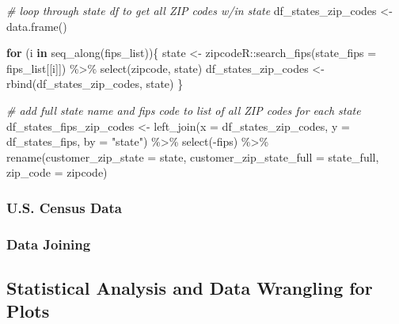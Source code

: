 \documentclass[
]{book}
\newenvironment{Shaded}{\begin{snugshade}}{\end{snugshade}}
\newcommand{\AttributeTok}[1]{\textcolor[rgb]{0.77,0.63,0.00}{#1}}
\newcommand{\CommentTok}[1]{\textcolor[rgb]{0.56,0.35,0.01}{\textit{#1}}}
\newcommand{\ControlFlowTok}[1]{\textcolor[rgb]{0.13,0.29,0.53}{\textbf{#1}}}
\newcommand{\FunctionTok}[1]{\textcolor[rgb]{0.00,0.00,0.00}{#1}}
\newcommand{\NormalTok}[1]{#1}
\newcommand{\OtherTok}[1]{\textcolor[rgb]{0.56,0.35,0.01}{#1}}
\newcommand{\SpecialCharTok}[1]{\textcolor[rgb]{0.00,0.00,0.00}{#1}}
\newcommand{\StringTok}[1]{\textcolor[rgb]{0.31,0.60,0.02}{#1}}
\begin{document}
\begin{Shaded}
\begin{Highlighting}[]
\CommentTok{\# loop through state df to get all ZIP codes w/in state}
\NormalTok{df\_states\_zip\_codes }\OtherTok{\textless{}{-}} \FunctionTok{data.frame}\NormalTok{()}

\ControlFlowTok{for}\NormalTok{ (i }\ControlFlowTok{in} \FunctionTok{seq\_along}\NormalTok{(fips\_list))\{}
\NormalTok{  state }\OtherTok{\textless{}{-}}\NormalTok{ zipcodeR}\SpecialCharTok{::}\FunctionTok{search\_fips}\NormalTok{(}\AttributeTok{state\_fips =}\NormalTok{ fips\_list[[i]]) }\SpecialCharTok{\%\textgreater{}\%} 
    \FunctionTok{select}\NormalTok{(zipcode, state)}
\NormalTok{  df\_states\_zip\_codes }\OtherTok{\textless{}{-}} \FunctionTok{rbind}\NormalTok{(df\_states\_zip\_codes, state)}
\NormalTok{\}}

\CommentTok{\# add full state name and fips code to list of all ZIP codes for each state}
\NormalTok{df\_states\_fips\_zip\_codes }\OtherTok{\textless{}{-}} 
  \FunctionTok{left\_join}\NormalTok{(}\AttributeTok{x =}\NormalTok{ df\_states\_zip\_codes,}
            \AttributeTok{y =}\NormalTok{ df\_states\_fips,}
            \AttributeTok{by =} \StringTok{"state"}\NormalTok{) }\SpecialCharTok{\%\textgreater{}\%} 
  \FunctionTok{select}\NormalTok{(}\SpecialCharTok{{-}}\NormalTok{fips) }\SpecialCharTok{\%\textgreater{}\%} 
  \FunctionTok{rename}\NormalTok{(}\AttributeTok{customer\_zip\_state =}\NormalTok{ state,}
         \AttributeTok{customer\_zip\_state\_full =}\NormalTok{ state\_full,}
         \AttributeTok{zip\_code =}\NormalTok{ zipcode)}
\end{Highlighting}
\end{Shaded}

\hypertarget{u.s.-census-data}{%
\subsubsection{U.S. Census Data}\label{u.s.-census-data}}

\hypertarget{data-joining}{%
\subsubsection{Data Joining}\label{data-joining}}

\hypertarget{statistical-analysis-and-data-wrangling-for-plots}{%
\subsection{Statistical Analysis and Data Wrangling for Plots}\label{statistical-analysis-and-data-wrangling-for-plots}}
\end{document}
